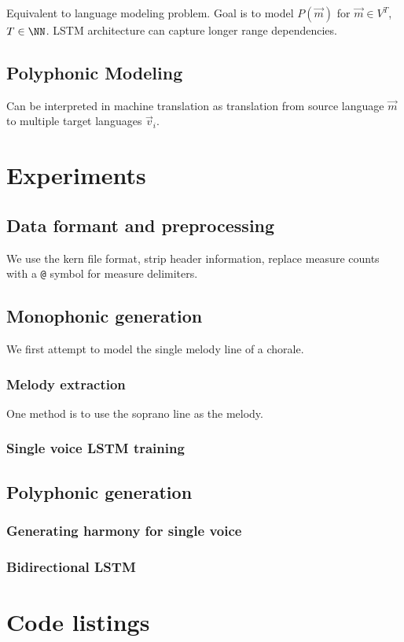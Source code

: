 \documentclass[a4paper,oneside,reqno,onecolumn]{amsart}
\begin{document}
Equivalent to language modeling problem. Goal is to model $P(\vec{m})$ for $\vec{m}
\in V^T$, $T \in \NN$. LSTM architecture can capture longer range dependencies.

\subsection{Polyphonic Modeling}

Can be interpreted in machine translation as translation from source language $\vec{m}$
to multiple target languages $\vec{v}_i$.

\section{Experiments}

\subsection{Data formant and preprocessing}

We use the kern file format, strip header information, replace measure counts
with a \texttt{@} symbol for measure delimiters.

\subsection{Monophonic generation}

We first attempt to model the single melody line of a chorale.

\subsubsection{Melody extraction}

One method is to use the soprano line as the melody.


\subsubsection{Single voice LSTM training}

\subsection{Polyphonic generation}

\subsubsection{Generating harmony for single voice}

\subsubsection{Bidirectional LSTM}


\nocite{*}


\onecolumn

\appendix

\section{Code listings}
\end{document}
